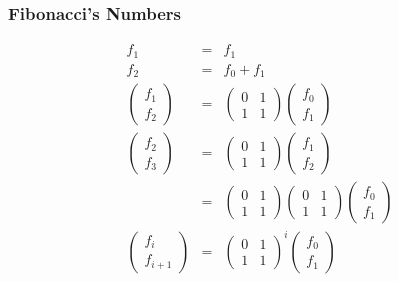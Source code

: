 \documentclass{beamer}
\begin{document}
\begin{CJK}{UTF8}{bsmi}
\begin{frame}
\frametitle{Fibonacci's Numbers}
\begin{eqnarray}
f_1 & = & f_1 \\
f_2 & = & f_0 + f_1 \\
\left( 
\begin{array}{c}
f_1 \\ f_2 
\end{array}
\right) 
& = & 
\left( 
\begin{array}{cc}
0 & 1 \\ 1 & 1 
\end{array}
\right) 
\left( 
\begin{array}{c}
f_0 \\ f_1 
\end{array}
\right)  \\
\left( 
\begin{array}{c}
f_2 \\ f_3 
\end{array}
\right) 
& = & 
\left( 
\begin{array}{cc}
0 & 1 \\ 1 & 1 
\end{array}
\right) 
\left( 
\begin{array}{c}
f_1 \\ f_2 
\end{array}
\right) \\
& = & 
\left( 
\begin{array}{cc}
0 & 1 \\ 1 & 1 
\end{array}
\right) 
\left( 
\begin{array}{cc}
0 & 1 \\ 1 & 1 
\end{array}
\right) 
\left( 
\begin{array}{c}
f_0 \\ f_1 
\end{array}
\right) \\
\left( 
\begin{array}{c}
f_i \\ f_{i+1} 
\end{array}
\right) 
& = & 
\left( 
\begin{array}{cc}
0 & 1 \\ 1 & 1 
\end{array}
\right) ^ i
\left( 
\begin{array}{c}
f_0 \\ f_1 
\end{array}
\right)
\end{eqnarray}
\end{frame}


\end{CJK}
\end{document}
